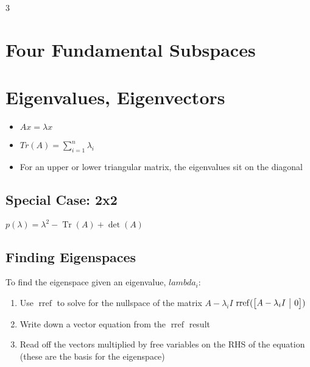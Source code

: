 \documentclass[10pt,landscape,a4paper]{article}
\makeatletter
\DeclareMathOperator{\Tr}{Tr}
\DeclareMathOperator{\rref}{rref}
\newenvironment{amatrix}[1]{%
  \left[\begin{array}{@{}*{#1}{c}|c@{}}
}{%
  \end{array}\right]
}
\makeatother
\begin{document}
\small
\begin{multicols*}{3}
  \section{Four Fundamental Subspaces}

  \section{Eigenvalues, Eigenvectors}
  \begin{itemize}
    \item $Ax = \lambda x$
    \item $Tr(A) = \sum_{i=1}^n \lambda_i$
    \item For an upper or lower triangular matrix, the eigenvalues sit on the
      diagonal


  \end{itemize}
  \subsection{Special Case: 2x2}
  $p(\lambda) = \lambda^2 - \Tr(A) + \det(A)$
  \subsection{Finding Eigenspaces}
  To find the eigenspace given an eigenvalue, $lambda_i$:
  \begin{enumerate}
    \item Use $\rref$ to solve for the nullspace of the matrix $A-\lambda_i I$
          \begin{math}
            \rref(
              \begin{amatrix}{1}
                 A-\lambda_i I & 0
              \end{amatrix}
            )
          \end{math}
    \item Write down a vector equation from the $\rref$ result
    \item Read off the vectors multiplied by free variables on the RHS of the
      equation (these are the basis for the eigenspace)
  \end{enumerate}



\end{multicols*}
\end{document}
